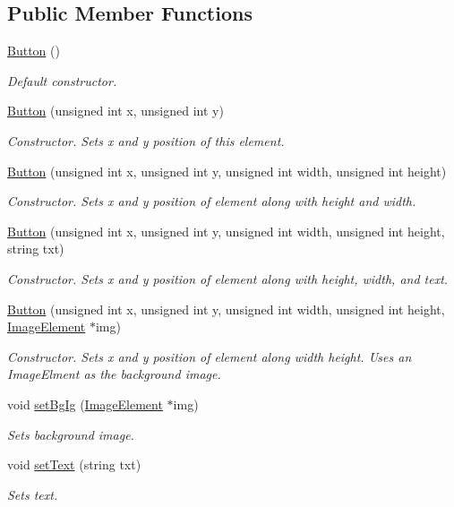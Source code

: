 \subsection*{Public Member Functions}
\begin{DoxyCompactItemize}
\item 
\hyperlink{class_button_a3b36df1ae23c58aedb9e15a713159459}{Button} ()
\begin{DoxyCompactList}\small\item\em Default constructor. \end{DoxyCompactList}\item 
\hyperlink{class_button_afe6b0b69a06839e5381cab7d9eaf4f10}{Button} (unsigned int x, unsigned int y)
\begin{DoxyCompactList}\small\item\em Constructor. Sets x and y position of this element. \end{DoxyCompactList}\item 
\hyperlink{class_button_a3c5ea0097e8e4abf139a558c53f022d2}{Button} (unsigned int x, unsigned int y, unsigned int width, unsigned int height)
\begin{DoxyCompactList}\small\item\em Constructor. Sets x and y position of element along with height and width. \end{DoxyCompactList}\item 
\hyperlink{class_button_a0446975c84ebf54a1a1fa88690689e34}{Button} (unsigned int x, unsigned int y, unsigned int width, unsigned int height, string txt)
\begin{DoxyCompactList}\small\item\em Constructor. Sets x and y position of element along with height, width, and text. \end{DoxyCompactList}\item 
\hyperlink{class_button_a89eeede6ce15964118eee29990872c96}{Button} (unsigned int x, unsigned int y, unsigned int width, unsigned int height, \hyperlink{class_image_element}{Image\-Element} $\ast$img)
\begin{DoxyCompactList}\small\item\em Constructor. Sets x and y position of element along width height. Uses an Image\-Elment as the background image. \end{DoxyCompactList}\item 
void \hyperlink{class_button_a836cb30a97ad2abeb67b0b0a6dc30dbd}{set\-Bg\-Ig} (\hyperlink{class_image_element}{Image\-Element} $\ast$img)
\begin{DoxyCompactList}\small\item\em Sets background image. \end{DoxyCompactList}\item 
void \hyperlink{class_button_a1794b3856606e75716fc7e2611b1b711}{set\-Text} (string txt)
\begin{DoxyCompactList}\small\item\em Sets text. \end{DoxyCompactList}\end{DoxyCompactItemize}
